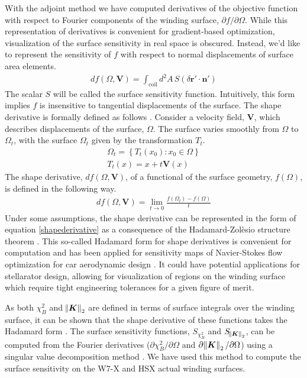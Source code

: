 \documentclass[aps,unsortedaddress]{revtex4-1}
\begin{document}
With the adjoint method we have computed derivatives of the objective function with respect to Fourier components of the winding surface, $\partial f/\partial \Omega$. While this representation of derivatives is convenient for gradient-based optimization, visualization of the surface sensitivity in real space is obscured. Instead, we'd like to represent the sensitivity of $f$ with respect to normal displacements of surface area elements. 
\begin{gather}
d f(\Omega,\bm{V}) = \int_{\text{coil}} d^2 A \, S \left( \delta \bm{r}' \cdot \bm{n}' \right)
\label{shapederivative}
\end{gather}
The scalar $S$ will be called the surface sensitivity function. Intuitively, this form implies $f$ is insensitive to tangential displacements of the surface. The shape derivative is formally defined as follows \cite{Delfour2011}. Consider a velocity field, $\bm{V}$, which describes displacements of the surface, $\Omega$. The surface varies smoothly from $\Omega$ to $\Omega_t$, with the surface $\Omega_t$ given by the transformation $T_t$.
\begin{gather}
\Omega_t = \left \{ T_t(x_0) : x_0 \in \Omega \right \} \\
T_t(x) = x + t \bm{V}(x)
\end{gather}
The shape derivative, $df(\Omega,\bm{V})$, of a functional of the surface geometry, $f(\Omega)$, is defined in the following way. 
\begin{gather}
d f(\Omega, \bm{V}) = \lim_{t \rightarrow 0} \frac{ f(\Omega_t) - f(\Omega)}{t}
\end{gather}
Under some assumptions, the shape derivative can be represented in the form of equation \ref{shapederivative} as a consequence of the Hadamard-Zol\`{e}sio structure theorem \cite{Delfour2011}. This so-called Hadamard form for shape derivatives is convenient for computation and has been applied for sensitivity maps of Navier-Stokes flow optimization for car aerodynamic design \cite{Othmer2008,Othmer2014}. It could have potential applications for stellarator design, allowing for visualization of regions on the winding surface which require tight engineering tolerances for a given figure of merit. 

As both $\chi^2_B$ and $\norm{\bm{K}}_2$ are defined in terms of surface integrals over the winding surface, it can be shown that the shape derivative of these functions takes the Hadamard form \cite{Novotny2013}. The surface sensitivity functions, $S_{\chi^2_B}$ and $S_{\norm{\bm{K}}_2}$, can be computed from the Fourier derivatives ($\partial \chi^2_B/\partial \Omega$ and $\partial \norm{\bm{K}}_2/\partial \Omega$) using a singular value decomposition method \cite{Landreman2018}. We have used this method to compute the surface sensitivity on the W7-X and HSX actual winding surfaces.  
\end{document}
